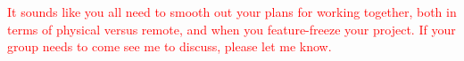 \documentclass[11pt]{article}   %
\newcommand{\dcomment}[1]{\textcolor{red}{#1}}
\begin{document}









\dcomment{It sounds like you all need to smooth out your plans for working together, both
  in terms of physical versus remote, and when you feature-freeze your project.  If your group
needs to come see me to discuss, please let me know.}
\end{document}

